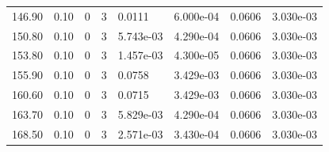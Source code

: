 \documentclass[preview]{standalone}
\begin{document}
{{\begin{tabular}{L{1.2cm}C{1.2cm} C{0.3cm}C{0.5cm} C{1.4cm}C{1.4cm} C{1.4cm}C{1.4cm}}
  146.90  &  0.10  & 0     &  3 &  0.0111  & 6.000e-04  & 0.0606 &  3.030e-03   \\ 
  150.80  &  0.10  & 0     &  3 &  5.743e-03  & 4.290e-04  & 0.0606 &  3.030e-03   \\ 
  153.80  &  0.10  & 0     &  3 &  1.457e-03  & 4.300e-05  & 0.0606 &  3.030e-03   \\ 
  155.90  &  0.10  & 0     &  3 &  0.0758  & 3.429e-03  & 0.0606 &  3.030e-03   \\ 
  160.60  &  0.10  & 0     &  3 &  0.0715  & 3.429e-03  & 0.0606 &  3.030e-03   \\ 
  163.70  &  0.10  & 0     &  3 &  5.829e-03  & 4.290e-04  & 0.0606 &  3.030e-03   \\ 
  168.50  &  0.10  & 0     &  3 &  2.571e-03  & 3.430e-04  & 0.0606 &  3.030e-03   \\ 
\hline 
\end{tabular} 

}}
\end{document}
